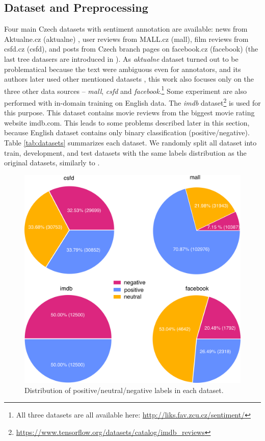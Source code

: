 \subsection{Dataset and Preprocessing}
Four main Czech datasets with sentiment annotation are available: news from Aktualne.cz (aktualne) \citep{Veselovska}, user reviews from MALL.cz (mall), film reviews from csfd.cz (csfd), and posts from Czech branch pages on facebook.cz (facebook) (the last tree datasers are introduced in \citealp{Habernal.et.al.2013}). As \textit{aktualne} dataset turned out to be problematical because the text were ambiguous even for annotators, and its authors later used other mentioned datasets \citep{Veselovska}, this work also focuses only on the three other data sources -- \textit{mall}, \textit{csfd} and \textit{facebook}.\footnote{All three datasets are all available here: \url{http://liks.fav.zcu.cz/sentiment/}} Some experiment are also performed with in-domain training on English data. The \textit{imdb} dataset\footnote{\url{https://www.tensorflow.org/datasets/catalog/imdb\_reviews}} is used for this purpose. This dataset contains movie reviews from the biggest movie rating website imdb.com. This leads to some problems described later in this section, because English dataset contains only binary classification (positive/negative). Table \ref{tab:datasets} summarizes each dataset. We randomly split all dataset into train, development, and test datasets with the same labels distribution as the original datasets, similarly to \citet{Sido2021}.
\par
\begin{figure}[!h]
\centering
\includegraphics[width=0.95\columnwidth]{../img/dist_all.png}
\protect\caption{Distribution of positive/neutral/negative labels in each dataset.}
\label{pic:dist}
\end{figure}

